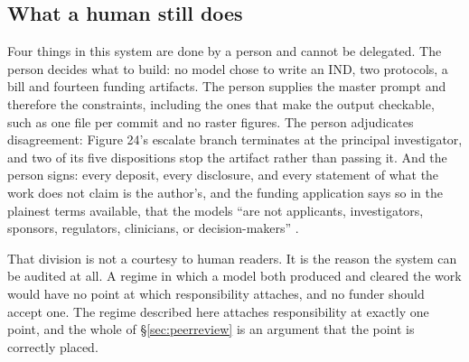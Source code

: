 \subsection{What a human still does}

Four things in this system are done by a person and cannot be delegated. The
person decides what to build: no model chose to write an IND, two protocols, a
bill and fourteen funding artifacts. The person supplies the master prompt and
therefore the constraints, including the ones that make the output checkable,
such as one file per commit and no raster figures. The person adjudicates
disagreement: Figure 24's escalate branch terminates at the principal
investigator, and two of its five dispositions stop the artifact rather than
passing it. And the person signs: every deposit, every disclosure, and every
statement of what the work does not claim is the author's, and the funding
application says so in the plainest terms available, that the models ``are not
applicants, investigators, sponsors, regulators, clinicians, or
decision-makers'' \cite{rfarm27001v2}.

That division is not a courtesy to human readers. It is the reason the system
can be audited at all. A regime in which a model both produced and cleared the
work would have no point at which responsibility attaches, and no funder should
accept one. The regime described here attaches responsibility at exactly one
point, and the whole of \S\ref{sec:peerreview} is an argument that the point is
correctly placed.
